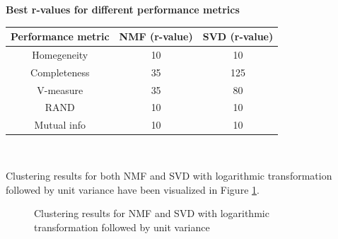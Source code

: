 \documentclass{article}
\begin{document}
\begin{center}
	\textbf{Best r-values for different performance metrics} \\ \vspace{10pt}
	\begin{tabular}{*{3}{c}}
		\toprule
		\textbf{Performance metric} & \textbf{NMF (r-value)} & \textbf{SVD (r-value)} \\
		\midrule
		Homegeneity & 10 & 10 \\
		\midrule		
		Completeness & 35 & 125 \\
		\midrule		
		V-measure & 35 & 80 \\
		\midrule		
		RAND & 10 & 10   \\
		\midrule
		Mutual info & 10 & 10  \\
		\bottomrule
	\end{tabular}
\end{center}

\\ \vspace{20pt}

Clustering results for both NMF and SVD with logarithmic transformation followed by unit variance have been visualized in Figure \ref{fig:nmf_svd3}. \\

\begin{figure}[!ht]%
	\centering
		\qquad
		\vspace*{-3mm}
	\caption{Clustering results for NMF and SVD with logarithmic transformation followed by unit variance}
	\label{fig:nmf_svd3}
\end{figure}
\newpage
\end{document}
